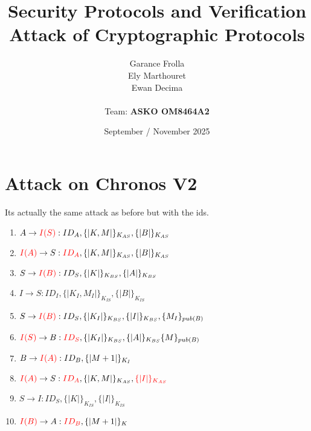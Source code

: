 \documentclass[11pt]{article}
\begin{document}
    \title{
            { \textbf{Security Protocols and Verification}} \\[1ex]
        {\small Attack of Cryptographic Protocols}
    }


    \author{
        Garance Frolla \\
        Ely Marthouret \\
        Ewan Decima\\ \\
        Team: \textbf{ASKO OM8464A2}
    }

    \date{September / November 2025}


    \maketitle
    \tableofcontents
    \newpage



    \section{Attack on Chronos V2}
    Its actually the same attack as before but with the ids.

    \begin{enumerate}
        \item $A \rightarrow \textcolor{red}{I(S)} : ID_A,\{| K, M |\}_{K_{AS}}, \{|B|\}_{K_{AS}}$
        \item $\textcolor{red}{I(A)} \rightarrow S : \textcolor{red}{ID_A}, \{| K, M |\}_{K_{AS}}, \{|B|\}_{K_{AS}}$
        \item $S \rightarrow \textcolor{red}{I(B)} : ID_S,\{| K |\}_{K_{BS}}, \{|A|\}_{K_{BS}}$
        \item $I \rightarrow S : ID_I,\{| K_I, M_I |\}_{K_{IS}}, \{|B|\}_{K_{IS}}$
        \item $S \rightarrow \textcolor{red}{I(B)} : ID_S,\{|K_I|\}_{K_{BS}}, \{|I|\}_{K_{BS}}, \{M_I\}_{pub(B)}$
        \item $\textcolor{red}{I(S)} \rightarrow B : \textcolor{red}{ID_S},\{|K_I|\}_{K_{BS}}, \{|A|\}_{K_{BS}} \{M\}_{pub(B)}$
        \item $B \rightarrow \textcolor{red}{I(A)} : ID_B,\{|M+1|\}_{K_I}$
        \item $\textcolor{red}{I(A)} \rightarrow S: \textcolor{red}{ID_A},\{| K, M |\}_{K_{AS}}, \textcolor{red}{\{|I|\}_{K_{AS}}}$
        \item $S \rightarrow I : ID_S,\{|K|\}_{K_{IS}}, \{|I|\}_{K_{IS}}$
        \item $\textcolor{red}{I(B)} \rightarrow A : \textcolor{red}{ID_B}, \{|M+1|\}_K$

    \end{enumerate}
\end{document}
